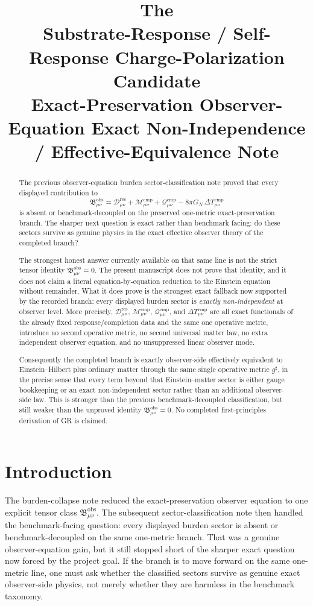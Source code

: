 \documentclass[11pt]{article}
\title{\textbf{The \TheoryName{}}\\[0.4em]
\large Substrate-Response / Self-Response Charge-Polarization Candidate\\
\large Exact-Preservation Observer-Equation Exact Non-Independence / Effective-Equivalence Note}
\author{}
\date{}
\newcommand{\CompletedMetric}{g^{\sharp}}
\newcommand{\ResidualDec}{\mathcal D_{\mu\nu}^{\mathrm{res}}}
\newcommand{\CompMix}{\mathcal M_{\mu\nu}^{\mathrm{cmp}}}
\newcommand{\CompQuad}{\mathcal Q_{\mu\nu}^{\mathrm{cmp}}}
\newcommand{\DeltaTComp}{\Delta T_{\mu\nu}^{\mathrm{cmp}}}
\newcommand{\ObsBurden}{\mathfrak B_{\mu\nu}^{\mathrm{obs}}}
\begin{document}
\maketitle

\begin{abstract}
The previous observer-equation burden sector-classification note proved that every displayed contribution to
\[
\ObsBurden
=
\ResidualDec+\CompMix+\CompQuad-8\pi G_N\,\DeltaTComp
\]
is absent or benchmark-decoupled on the preserved one-metric exact-preservation branch. The sharper next question is exact rather than benchmark facing: do these sectors survive as genuine physics in the exact effective observer theory of the completed branch?

The strongest honest answer currently available on that same line is not the strict tensor identity \(\ObsBurden=0\). The present manuscript does not prove that identity, and it does not claim a literal equation-by-equation reduction to the Einstein equation without remainder. What it does prove is the strongest exact fallback now supported by the recorded branch: every displayed burden sector is \emph{exactly non-independent} at observer level. More precisely, \(\ResidualDec\), \(\CompMix\), \(\CompQuad\), and \(\DeltaTComp\) are all exact functionals of the already fixed response/completion data and the same one operative metric, introduce no second operative metric, no second universal matter law, no extra independent observer equation, and no unsuppressed linear observer mode.

Consequently the completed branch is exactly observer-side effectively equivalent to Einstein--Hilbert plus ordinary matter through the same single operative metric \(\CompletedMetric\), in the precise sense that every term beyond that Einstein--matter sector is either gauge bookkeeping or an exact non-independent sector rather than an additional observer-side law. This is stronger than the previous benchmark-decoupled classification, but still weaker than the unproved identity \(\ObsBurden=0\). No completed first-principles derivation of GR is claimed.
\end{abstract}

\section{Introduction}

The burden-collapse note reduced the exact-preservation observer equation to one explicit tensor class \(\ObsBurden\). The subsequent sector-classification note then handled the benchmark-facing question: every displayed burden sector is absent or benchmark-decoupled on the same one-metric branch. That was a genuine observer-equation gain, but it still stopped short of the sharper exact question now forced by the project goal. If the branch is to move forward on the same one-metric line, one must ask whether the classified sectors survive as genuine exact observer-side physics, not merely whether they are harmless in the benchmark taxonomy.
\end{document}

